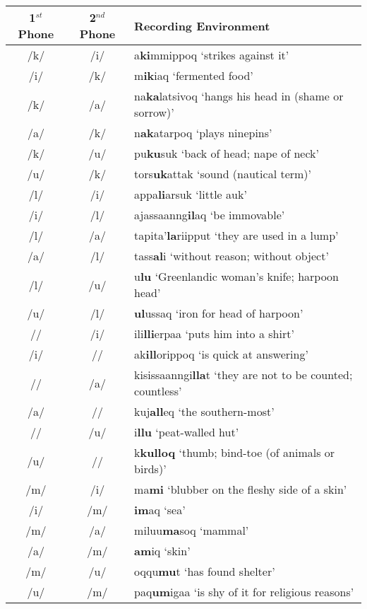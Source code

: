 \documentclass[12pt]{article}
\begin{document}
	\newpage
	\begin{centering}
	\begin{tabular}{|c|c|l|}
	\hline
	1$^{st}$ Phone & 2$^{nd}$ Phone & Recording Environment \\
	\hline
	/k/ & /i/ & a\textbf{ki}mmippoq `strikes against it' \\
	/i/ & /k/ & m\textbf{ik}iaq `fermented food' \\
	/k/ & /a/ & na\textbf{ka}latsivoq `hangs his head in (shame or sorrow)'\\
	/a/ & /k/ & n\textbf{ak}atarpoq `plays ninepins' \\
	/k/ & /u/ & pu\textbf{ku}suk `back of head; nape of neck' \\
	/u/ & /k/ & tors\textbf{uk}attak `sound (nautical term)' \\
	/l/ & /i/ & appa\textbf{li}arsuk `little auk'\\
	/i/ & /l/ & ajassaanng\textbf{il}aq `be immovable'\\
	/l/ & /a/ & tapita'\textbf{la}riipput `they are used in a lump'\\
	/a/ & /l/ & tass\textbf{al}i `without reason; without object'\\
	/l/ & /u/ & u\textbf{lu} `Greenlandic woman's knife; harpoon head'\\
	/u/ & /l/ & \textbf{ul}ussaq `iron for head of harpoon'\\
	/\textbeltl/ & /i/ & ili\textbf{lli}erpaa `puts him into a shirt'\\
	/i/ & /\textbeltl/ & ak\textbf{ill}orippoq `is quick at answering'\\
	/\textbeltl/ & /a/ & kisissaanngi\textbf{lla}t `they are not to be counted; countless'\\
	/a/ & /\textbeltl/ & kuj\textbf{all}eq `the southern-most'\\
	/\textbeltl/ & /u/ & i\textbf{llu} `peat-walled hut' \\
	/u/ & /\textbeltl/ & k\textbf{kulloq} `thumb; bind-toe (of animals or birds)'\\
	/m/ & /i/ & ma\textbf{mi} `blubber on the fleshy side of a skin'\\
	/i/ & /m/ & \textbf{im}aq `sea' \\
	/m/ & /a/ & miluu\textbf{ma}soq `mammal'\\
	/a/ & /m/ & \textbf{am}iq `skin' \\
	/m/ & /u/ & oqqu\textbf{mu}t `has found shelter'\\
	/u/ & /m/ & paq\textbf{um}igaa `is shy of it for religious reasons'\\
	\hline
	\end{tabular}
	\end{centering}
\end{document}
